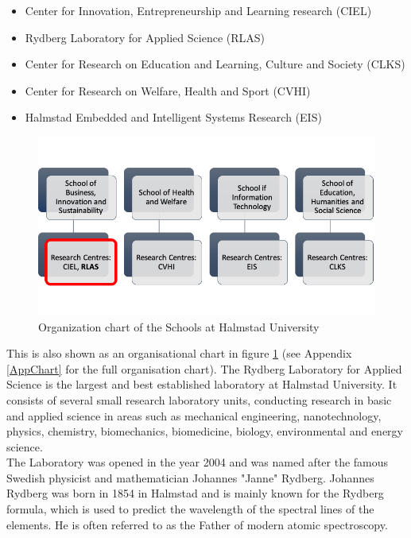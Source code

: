 \begin{itemize}
	\item Center for Innovation, Entrepreneurship and Learning research (CIEL)
	\item Rydberg Laboratory for Applied Science (RLAS)
	\item Center for Research on Education and Learning, Culture and Society (CLKS)
	\item Center for Research on Welfare, Health and Sport (CVHI)
	\item Halmstad Embedded and Intelligent Systems Research (EIS)
\end{itemize}

\begin{figure}[h]
\begin{center}
\includegraphics[width=12cm]{Pictures/SchoolsHH}
\caption[Organization chart of the Schools at Halmstad University]{Organization chart of the Schools at Halmstad University\cite{UniversityOrga}}
\label{Schools_HH}
\end{center}
\end{figure}

This is also shown as an organisational chart in figure \ref{Schools_HH} (see Appendix \ref{AppChart} for the full organisation chart). The Rydberg Laboratory for Applied Science is the largest and best established laboratory at Halmstad University. It consists of several small research laboratory units, conducting research in basic and applied science in areas such as mechanical engineering, nanotechnology, physics, chemistry, biomechanics, biomedicine, biology, environmental and energy science.\cite{RydbergCoreLab}\\
The Laboratory was opened in the year 2004 and was named after the famous Swedish physicist and mathematician Johannes "Janne" Rydberg. Johannes Rydberg was born in 1854 in Halmstad and is mainly known for the Rydberg formula, which is used to predict the wavelength of the spectral lines of the elements. He is often referred to as the Father of modern atomic spectroscopy.
 



